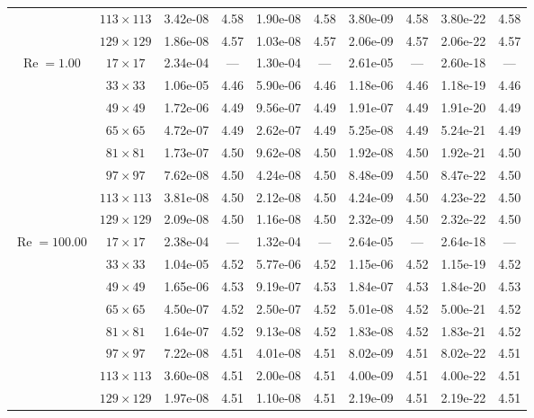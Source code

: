 \documentclass[preprint, 12pt]{elsarticle}
\begin{document}
{\begin{center}
\begin{table}[H]
{\begin{tabular*}{\textwidth}{@{\extracolsep\fill}cccccccccc@{}}
    & $113\times 113$ & 3.42e-08 & 4.58 & 1.90e-08 & 4.58 & 3.80e-09 & 4.58 & 3.80e-22 & 4.58 \\
    & $129\times 129$ & 1.86e-08 & 4.57 & 1.03e-08 & 4.57 & 2.06e-09 & 4.57 & 2.06e-22 & 4.57 \\
    \hline\hline
    \multirow{7}{*}{$\operatorname{Re}=1.00$} & $17\times 17$ & 2.34e-04 & --- & 1.30e-04 & --- & 2.61e-05 & --- & 2.60e-18 & --- \\
    & $33\times 33$ & 1.06e-05 & 4.46 & 5.90e-06 & 4.46 & 1.18e-06 & 4.46 & 1.18e-19 & 4.46 \\
    & $49\times 49$ & 1.72e-06 & 4.49 & 9.56e-07 & 4.49 & 1.91e-07 & 4.49 & 1.91e-20 & 4.49 \\
    \multirow{3}{*}{$\operatorname{Wi}=10$} & $65\times 65$ & 4.72e-07 & 4.49 & 2.62e-07 & 4.49 & 5.25e-08 & 4.49 & 5.24e-21 & 4.49 \\
    & $81\times 81$ & 1.73e-07 & 4.50 & 9.62e-08 & 4.50 & 1.92e-08 & 4.50 & 1.92e-21 & 4.50 \\
    & $97\times 97$ & 7.62e-08 & 4.50 & 4.24e-08 & 4.50 & 8.48e-09 & 4.50 & 8.47e-22 & 4.50 \\
    & $113\times 113$ & 3.81e-08 & 4.50 & 2.12e-08 & 4.50 & 4.24e-09 & 4.50 & 4.23e-22 & 4.50 \\
    & $129\times 129$ & 2.09e-08 & 4.50 & 1.16e-08 & 4.50 & 2.32e-09 & 4.50 & 2.32e-22 & 4.50 \\
    \hline
    \multirow{7}{*}{$\operatorname{Re}=100.00$} & $17\times 17$ & 2.38e-04 & --- & 1.32e-04 & --- & 2.64e-05 & --- & 2.64e-18 & --- \\
    & $33\times 33$ & 1.04e-05 & 4.52 & 5.77e-06 & 4.52 & 1.15e-06 & 4.52 & 1.15e-19 & 4.52 \\
    & $49\times 49$ & 1.65e-06 & 4.53 & 9.19e-07 & 4.53 & 1.84e-07 & 4.53 & 1.84e-20 & 4.53 \\
    \multirow{3}{*}{$\operatorname{Wi}=10$} & $65\times 65$ & 4.50e-07 & 4.52 & 2.50e-07 & 4.52 & 5.01e-08 & 4.52 & 5.00e-21 & 4.52 \\
    & $81\times 81$ & 1.64e-07 & 4.52 & 9.13e-08 & 4.52 & 1.83e-08 & 4.52 & 1.83e-21 & 4.52 \\
    & $97\times 97$ & 7.22e-08 & 4.51 & 4.01e-08 & 4.51 & 8.02e-09 & 4.51 & 8.02e-22 & 4.51 \\
    & $113\times 113$ & 3.60e-08 & 4.51 & 2.00e-08 & 4.51 & 4.00e-09 & 4.51 & 4.00e-22 & 4.51 \\
    & $129\times 129$ & 1.97e-08 & 4.51 & 1.10e-08 & 4.51 & 2.19e-09 & 4.51 & 2.19e-22 & 4.51 \\

\end{tabular*}}
\end{table}
\end{center}}
\end{document}
